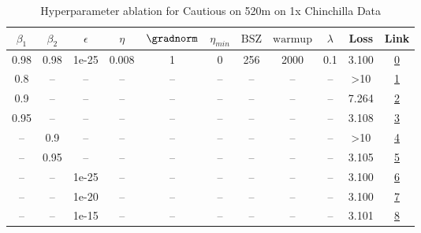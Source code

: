 \begin{table}[H]
\centering
\caption{Hyperparameter ablation for Cautious on 520m on 1x Chinchilla Data}
\label{tab:ablation_cautious_520m_on_1x_chinchilla_data}
\begin{tabular}{ccccccccccc}
\toprule
$\beta_1$ & $\beta_2$ & $\epsilon$ & $\eta$ & $\gradnorm$ & $\eta_{min}$ & $\mathrm{BSZ}$ & $\mathrm{warmup}$ & $\lambda$ & Loss & Link \\
\midrule
0.98 & 0.98 & 1e-25 & 0.008 & 1 & 0 & 256 & 2000 & 0.1 & 3.100 & \href{https://wandb.ai/stanford-mercury/optimizer-scaling/runs/sweep-520m-10B-cautiouscda486lr0.008-wd0.1-minlr0-warmup2000-b10-1d8924}{0} \\
\midrule
0.8 & -- & -- & -- & -- & -- & -- & -- & -- & >10 & \href{https://wandb.ai/stanford-mercury/optimizer-scaling/runs/sweep-520m-10B-cautioush937574lr0.008-wd0.1-minlr0-warmup2000-b1-288d18}{1} \\
0.9 & -- & -- & -- & -- & -- & -- & -- & -- & 7.264 & \href{https://wandb.ai/stanford-mercury/optimizer-scaling/runs/sweep-520m-10B-cautiousfe5526lr0.008-wd0.1-minlr0-warmup2000-b10-a0ea38}{2} \\
0.95 & -- & -- & -- & -- & -- & -- & -- & -- & 3.108 & \href{https://wandb.ai/stanford-mercury/optimizer-scaling/runs/sweep-520m-10B-cautiousb9bea7lr0.008-wd0.1-minlr0-warmup2000-b10-4e055f}{3} \\
-- & 0.9 & -- & -- & -- & -- & -- & -- & -- & >10 & \href{https://wandb.ai/stanford-mercury/optimizer-scaling/runs/sweep-520m-10B-cautiousfa5ab7lr0.008-wd0.1-minlr0-warmup2000-b10-fc260f}{4} \\
-- & 0.95 & -- & -- & -- & -- & -- & -- & -- & 3.105 & \href{https://wandb.ai/stanford-mercury/optimizer-scaling/runs/sweep-520m-10B-cautious06f834lr0.008-wd0.1-minlr0-warmup2000-b10-e18beb}{5} \\
-- & -- & 1e-25 & -- & -- & -- & -- & -- & -- & 3.100 & \href{https://wandb.ai/stanford-mercury/optimizer-scaling/runs/sweep-520m-10B-cautiouscda486lr0.008-wd0.1-minlr0-warmup2000-b10-1d8924}{6} \\
-- & -- & 1e-20 & -- & -- & -- & -- & -- & -- & 3.100 & \href{https://wandb.ai/stanford-mercury/optimizer-scaling/runs/sweep-520m-10B-cautious635735lr0.008-wd0.1-minlr0-warmup2000-b10-d30ff8}{7} \\
-- & -- & 1e-15 & -- & -- & -- & -- & -- & -- & 3.101 & \href{https://wandb.ai/stanford-mercury/optimizer-scaling/runs/sweep-520m-10B-cautiousfba4cdlr0.008-wd0.1-minlr0-warmup2000-b10-bfcfff}{8} \\

\end{tabular}
\end{table}
